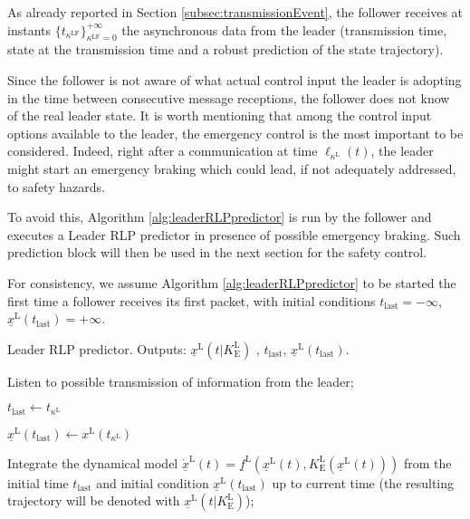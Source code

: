 As  already reported in Section \ref{subsec:transmissionEvent}, the follower receives at instants \(\{ t_{\kappa^\mathrm{LF}} \}_{\kappa^\mathrm{LF}=0}^{+\infty}\)
the asynchronous data from the leader (transmission time, state at the transmission time and a robust prediction of the state trajectory). 


Since the follower is not aware of what  actual control input  the leader is adopting in the time between consecutive message receptions, the follower does not know of the real leader state. It is worth mentioning that among the control input options available to the leader, the emergency control is the most important to be considered. Indeed, right after a communication at time $\ell_{\kappa^\mathrm{L}}(t)$, the leader might start an emergency braking which could lead, if not adequately addressed, to safety hazards. 

To avoid this,  Algorithm \ref{alg:leaderRLPpredictor} is run by the follower and executes a Leader RLP predictor in presence of possible emergency braking. Such prediction block will then be used in the next section for the safety control.

For consistency, we assume Algorithm \ref{alg:leaderRLPpredictor} to be started the first time a follower receives its first packet, with initial conditions $t_{\mathrm{last}}=-\infty$, $\underline{x}^\mathrm{L}(t_{\mathrm{last}})=+\infty$.


\begin{algorithm}
	\caption{Leader RLP predictor. Outputs: $\underline{x}^\mathrm{L}(t|K_\mathrm{E}^\mathrm{L})$ , $t_{\mathrm{last}}$, $\underline{x}^\mathrm{L}(t_{\mathrm{last}})$. }\label{alg:leaderRLPpredictor}
	\begin{algorithmic}[1]
		\Loop
		
		\State Listen to possible transmission of information from the leader;
		
		
		\State $t_{\mathrm{last}} \leftarrow t_{\kappa^\mathrm{L}}$
		
		\State $\underline{x}^\mathrm{L}(t_{\mathrm{last}}) \leftarrow x^\mathrm{L}(t_{\kappa^\mathrm{L}})$
		
		\EndIf
		
		
		\State Integrate the dynamical model  $\underline{\dot{x}}^\mathrm{L}(t) = \underline{f}^\mathrm{L}(\underline{x}^\mathrm{L}(t),K_\mathrm{E}^\mathrm{L}(\underline{x}^\mathrm{L}(t)))$ from the initial time $t_{\mathrm{last}}$ and initial condition $\underline{x}^\mathrm{L}(t_{\mathrm{last}})$  up to current time (the resulting trajectory will be denoted
		with $\underline{x}^\mathrm{L}(t|K_\mathrm{E}^\mathrm{L})$);
		
		
		
		\EndLoop
		
	\end{algorithmic}
\end{algorithm}


